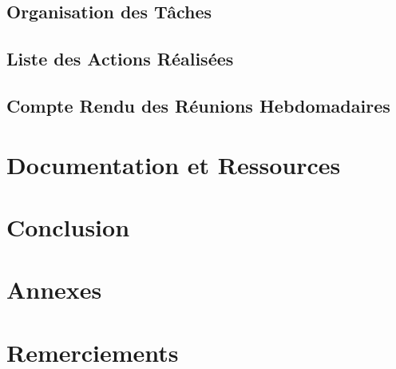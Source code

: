 \documentclass[a4paper,12pt]{report}  %
\begin{document}
	\subsection{Organisation des Tâches}
	
	\subsection{Liste des Actions Réalisées}
	
	\subsection{Compte Rendu des Réunions Hebdomadaires}
	
	\section{Documentation et Ressources}
	
	\section{Conclusion}
	
	\section{Annexes}
	
	\section{Remerciements}
	
	
	
%	
%	
%	
	
\end{document}
